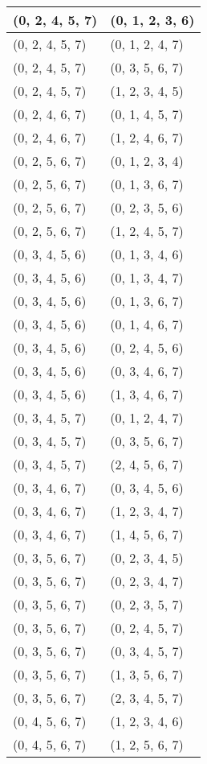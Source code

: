 \begin{footnotesize}
\begin{longtable}[c]{|l|l|}
(0, 2, 4, 5, 7)
&(0, 1, 2, 3, 6)
\\ \hline
(0, 2, 4, 5, 7)
&(0, 1, 2, 4, 7)
\\ \hline
(0, 2, 4, 5, 7)
&(0, 3, 5, 6, 7)
\\ \hline
(0, 2, 4, 5, 7)
&(1, 2, 3, 4, 5)
\\ \hline
(0, 2, 4, 6, 7)
&(0, 1, 4, 5, 7)
\\ \hline
(0, 2, 4, 6, 7)
&(1, 2, 4, 6, 7)
\\ \hline
(0, 2, 5, 6, 7)
&(0, 1, 2, 3, 4)
\\ \hline
(0, 2, 5, 6, 7)
&(0, 1, 3, 6, 7)
\\ \hline
(0, 2, 5, 6, 7)
&(0, 2, 3, 5, 6)
\\ \hline
(0, 2, 5, 6, 7)
&(1, 2, 4, 5, 7)
\\ \hline
(0, 3, 4, 5, 6)
&(0, 1, 3, 4, 6)
\\ \hline
(0, 3, 4, 5, 6)
&(0, 1, 3, 4, 7)
\\ \hline
(0, 3, 4, 5, 6)
&(0, 1, 3, 6, 7)
\\ \hline
(0, 3, 4, 5, 6)
&(0, 1, 4, 6, 7)
\\ \hline
(0, 3, 4, 5, 6)
&(0, 2, 4, 5, 6)
\\ \hline
(0, 3, 4, 5, 6)
&(0, 3, 4, 6, 7)
\\ \hline
(0, 3, 4, 5, 6)
&(1, 3, 4, 6, 7)
\\ \hline
(0, 3, 4, 5, 7)
&(0, 1, 2, 4, 7)
\\ \hline
(0, 3, 4, 5, 7)
&(0, 3, 5, 6, 7)
\\ \hline
(0, 3, 4, 5, 7)
&(2, 4, 5, 6, 7)
\\ \hline
(0, 3, 4, 6, 7)
&(0, 3, 4, 5, 6)
\\ \hline
(0, 3, 4, 6, 7)
&(1, 2, 3, 4, 7)
\\ \hline
(0, 3, 4, 6, 7)
&(1, 4, 5, 6, 7)
\\ \hline
(0, 3, 5, 6, 7)
&(0, 2, 3, 4, 5)
\\ \hline
(0, 3, 5, 6, 7)
&(0, 2, 3, 4, 7)
\\ \hline
(0, 3, 5, 6, 7)
&(0, 2, 3, 5, 7)
\\ \hline
(0, 3, 5, 6, 7)
&(0, 2, 4, 5, 7)
\\ \hline
(0, 3, 5, 6, 7)
&(0, 3, 4, 5, 7)
\\ \hline
(0, 3, 5, 6, 7)
&(1, 3, 5, 6, 7)
\\ \hline
(0, 3, 5, 6, 7)
&(2, 3, 4, 5, 7)
\\ \hline
(0, 4, 5, 6, 7)
&(1, 2, 3, 4, 6)
\\ \hline
(0, 4, 5, 6, 7)
&(1, 2, 5, 6, 7)

\end{longtable}
\end{footnotesize}
